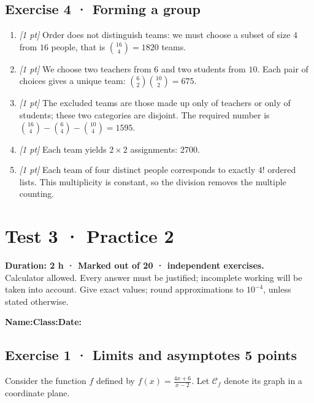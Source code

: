 \subsection*{Exercise 4 · Forming a group}\begin{enumerate}

\item \textit{[1 pt]} Order does not distinguish teams: we must choose a subset of size $4$ from $16$ people, that is $\binom{16}4=1820$ teams.

\item \textit{[1 pt]} We choose two teachers from $6$ and two students from $10$. Each pair of choices gives a unique team: $\binom{6}2\binom{10}2=675$.

\item \textit{[1 pt]} The excluded teams are those made up only of teachers or only of students; these two categories are disjoint. The required number is $\binom{16}4-\binom{6}4-\binom{10}4=1595$.

\item \textit{[1 pt]} Each team yields $2\times2$ assignments: $2700$.

\item \textit{[1 pt]} Each team of four distinct people corresponds to exactly $4!$ ordered lists. This multiplicity is constant, so the division removes the multiple counting.

\end{enumerate}

\fi

\mxnewpage{}\label{sujet:4-2}

\section*{Test 3 · Practice 2}


\textbf{Duration: 2 h · Marked out of 20 ·  independent exercises.}\\Calculator allowed. Every answer must be justified; incomplete working will be taken into account. Give exact values; round approximations to $10^{-4}$, unless stated otherwise.

\smallskip\textbf{Name:}\enspace\dotfill\quad\textbf{Class:}\enspace\dotfill\quad\textbf{Date:}\enspace\dotfill

\subsection*{Exercise 1 · Limits and asymptotes \hfill 5 points}Consider the function $f$ defined by $f(x)=\frac{4x+6}{x-2}$. Let $\mathcal C_f$ denote its graph in a coordinate plane.

